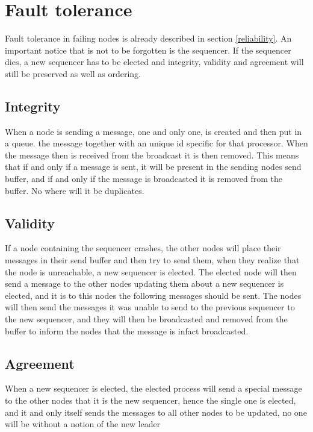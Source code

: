 \documentclass{article}
\begin{document}
\section{Fault tolerance}
  Fault tolerance in failing nodes is already described in section \ref{reliability}.
  An important notice that is not to be forgotten is the sequencer. If the sequencer 
  dies, a new sequencer has to be elected and integrity, validity and agreement will 
  still be preserved as well as ordering.
  \subsection{Integrity}
    When a node is sending a message, one and only one, is created and then put in a queue.
    the message together with an unique id specific for that processor. When the message then is 
    received from the broadcast it is then removed. This means that if and only if a message is 
    sent, it    will be present in the sending nodes send buffer, and if and only if the message
    is broadcasted it is removed from the buffer. No where will it be duplicates.
    
  \subsection{Validity}
    If a node containing the sequencer crashes, the other nodes will place their messages in their
    send buffer and then try to send them, when they realize that the node is unreachable, a new 
    sequencer is elected. The elected node will then send a message to the other nodes updating them
    about a new sequencer is elected, and it is to this nodes the following messages should be sent.
    The nodes will then send the messages it was unable to send to the previous sequencer to the
    new sequencer, and they will then be broadcasted and removed from the buffer to inform the nodes
    that the message is infact broadcasted.

  \subsection{Agreement}
    When a new sequencer is elected, the elected process will send a special message to the other nodes
    that it is the new sequencer, hence the single one is elected, and it and only itself sends the 
    messages to all other nodes to be updated, no one will be without a notion of the new leader
\end{document}
